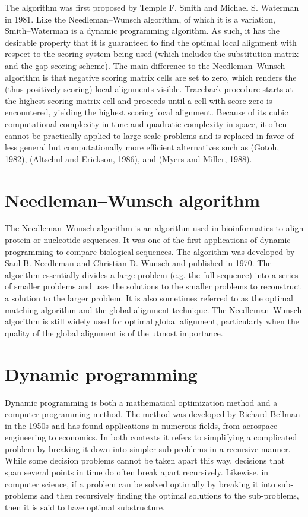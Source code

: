 \documentclass[a4paper]{article}
\begin{document}
The algorithm was first proposed by Temple F. Smith and Michael S. Waterman in 1981.
Like the Needleman–Wunsch algorithm, of which it is a variation, Smith–Waterman is a dynamic programming algorithm.
As such, it has the desirable property that it is guaranteed to find the optimal local alignment with respect to the scoring system being used (which includes the substitution matrix and the gap-scoring scheme).
The main difference to the Needleman–Wunsch algorithm is that negative scoring matrix cells are set to zero, which renders the (thus positively scoring) local alignments visible.
Traceback procedure starts at the highest scoring matrix cell and proceeds until a cell with score zero is encountered, yielding the highest scoring local alignment.
Because of its cubic computational complexity in time and quadratic complexity in space, it often cannot be practically applied to large-scale problems and is replaced in favor of less general but computationally more efficient alternatives such as (Gotoh, 1982), (Altschul and Erickson, 1986), and (Myers and Miller, 1988).

\section{Needleman–Wunsch algorithm}
\label{sec-3}
The Needleman–Wunsch algorithm is an algorithm used in bioinformatics to align protein or nucleotide sequences.
It was one of the first applications of dynamic programming to compare biological sequences.
The algorithm was developed by Saul B. Needleman and Christian D. Wunsch and published in 1970.
The algorithm essentially divides a large problem (e.g. the full sequence) into a series of smaller problems and uses the solutions to the smaller problems to reconstruct a solution to the larger problem.
It is also sometimes referred to as the optimal matching algorithm and the global alignment technique.
The Needleman–Wunsch algorithm is still widely used for optimal global alignment, particularly when the quality of the global alignment is of the utmost importance.

\section{Dynamic programming}
\label{sec-4}
Dynamic programming is both a mathematical optimization method and a computer programming method.
The method was developed by Richard Bellman in the 1950s and has found applications in numerous fields, from aerospace engineering to economics.
In both contexts it refers to simplifying a complicated problem by breaking it down into simpler sub-problems in a recursive manner.
While some decision problems cannot be taken apart this way, decisions that span several points in time do often break apart recursively.
Likewise, in computer science, if a problem can be solved optimally by breaking it into sub-problems and then recursively finding the optimal solutions to the sub-problems, then it is said to have optimal substructure.
\end{document}
